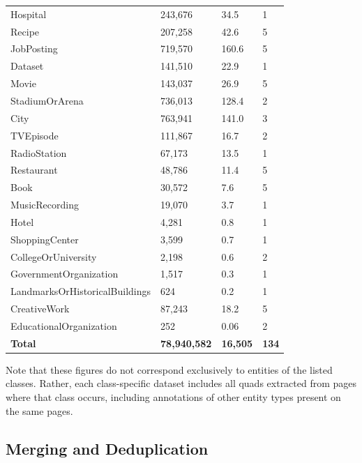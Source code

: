 \documentclass[11pt,a4paper]{article}
\begin{document}
\begin{longtable}{L{5.6cm} R{2.1cm} R{2.0cm} R{1.5cm}}
Hospital                        &    243{,}676   &    34.5   & 1 \\
Recipe                          &    207{,}258   &    42.6   & 5 \\
JobPosting                      &    719{,}570   &   160.6   & 5 \\
Dataset                         &    141{,}510   &    22.9   & 1 \\
Movie                           &    143{,}037   &    26.9   & 5 \\
StadiumOrArena                  &    736{,}013   &   128.4   & 2 \\
City                            &    763{,}941   &   141.0   & 3 \\
TVEpisode                       &    111{,}867   &    16.7   & 2 \\
RadioStation                    &     67{,}173   &    13.5   & 1 \\
Restaurant                      &     48{,}786   &    11.4   & 5 \\
Book                            &     30{,}572   &     7.6   & 5 \\
MusicRecording                  &     19{,}070   &     3.7   & 1 \\
Hotel                           &      4{,}281   &     0.8   & 1 \\
ShoppingCenter                  &      3{,}599   &     0.7   & 1 \\
CollegeOrUniversity             &      2{,}198   &     0.6   & 2 \\
GovernmentOrganization          &      1{,}517   &     0.3   & 1 \\
LandmarksOrHistoricalBuildings  &        624     &     0.2   & 1 \\
CreativeWork                    &     87{,}243   &    18.2   & 5 \\
EducationalOrganization         &        252     &     0.06  & 2 \\
\midrule
\textbf{Total}                  & \textbf{78{,}940{,}582} & \textbf{16{,}505} & \textbf{134} \\
\end{longtable}

Note that these figures do not correspond exclusively to entities of the listed classes. Rather, each class-specific dataset includes all quads extracted from pages where that class occurs, including annotations of other entity types present on the same pages.

\subsection{Merging and Deduplication}
\end{document}
